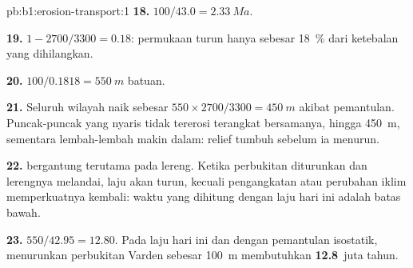 \begin{solution}{pb:b1:erosion-transport:1}
\textbf{18.} $100/43.0 = \qty{2.33}{Ma}$.

\textbf{19.} $1 - 2700/3300 = 0.18$: permukaan turun hanya sebesar
\qty{18}{\percent} dari ketebalan yang dihilangkan.

\textbf{20.} $100/0.1818 = \qty{550}{m}$ batuan.

\textbf{21.} Seluruh wilayah naik sebesar $550 \times 2700/3300 = \qty{450}{m}$
akibat pemantulan. Puncak-puncak yang nyaris tidak tererosi terangkat bersamanya, hingga
\qty{450}{m}, sementara lembah-lembah makin dalam: relief tumbuh sebelum ia menurun.

\textbf{22.}  bergantung terutama pada lereng. Ketika perbukitan diturunkan
dan lerengnya melandai, laju akan turun, kecuali pengangkatan atau perubahan iklim
memperkuatnya kembali: waktu yang dihitung dengan laju hari ini adalah batas bawah.

\textbf{23.} $550/42.95 = 12.80$. Pada laju hari ini dan dengan pemantulan isostatik,
menurunkan perbukitan Varden sebesar \qty{100}{m} membutuhkan \textbf{12.8}~juta tahun.
\end{solution}
